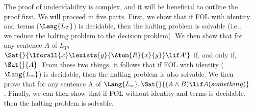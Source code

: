 \documentclass[../../include/open-logic-section]{subfiles}
\begin{document}

\begin{explain}
The proof of undecidability is complex, and it will be beneficial to
outline the proof first. We will proceed in five parts. First, we show that
if FOL with identity and terms ($\Lang{L_T}$) is decidable, then the
halting problem is solvable (i.e., we reduce the halting problem to the
decision problem). We then show that for any sentence $A$ of $L_T$,
$\Sat{}{\lforall{x}\lexists{y}{\Atom{R}{x}{y}}\lif A'}$ if, and only if,
$\Sat{}{A}$. From these two things, it follows that if FOL with identity
($\Lang{L_=}$) is decidable, then the halting problem is also solvable. We
then prove that for any sentence A of $\Lang{L_=} , \Sat{}{(A \land B) \lif
A (something)}$. Finally, we can then show that if FOL without identity and
terms is decidable, then the halting problem is solvable.
\end{explain}
\end{document}
